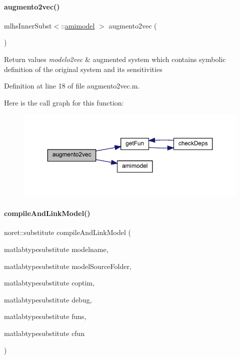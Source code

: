 \paragraph{\texorpdfstring{augmento2vec()}{augmento2vec()}}
{\footnotesize\ttfamily mlhs\+Inner\+Subst$<$\+::\mbox{\hyperlink{classamimodel}{amimodel}} $>$ augmento2vec (\begin{DoxyParamCaption}{ }\end{DoxyParamCaption})}


\begin{DoxyRetVals}{Return values}
{\em modelo2vec} & augmented system which contains symbolic definition of the original system and its sensitivities \\
\hline
\end{DoxyRetVals}


Definition at line 18 of file augmento2vec.\+m.

Here is the call graph for this function\+:
\nopagebreak
\begin{figure}[H]
\begin{center}
\leavevmode
\includegraphics[width=350pt]{classamimodel_ab8fea0d36484809cb38e0035a564e919_cgraph}
\end{center}
\end{figure}
\mbox{\label{classamimodel_a16e01624de4534ac1d1992bd685e2f56}} 
\paragraph{\texorpdfstring{compileAndLinkModel()}{compileAndLinkModel()}}
{\footnotesize\ttfamily noret\+::substitute compile\+And\+Link\+Model (\begin{DoxyParamCaption}\item[{matlabtypesubstitute}]{modelname,  }\item[{matlabtypesubstitute}]{model\+Source\+Folder,  }\item[{matlabtypesubstitute}]{coptim,  }\item[{matlabtypesubstitute}]{debug,  }\item[{matlabtypesubstitute}]{funs,  }\item[{matlabtypesubstitute}]{cfun }\end{DoxyParamCaption})\hspace{0.3cm}{\ttfamily [static]}}


